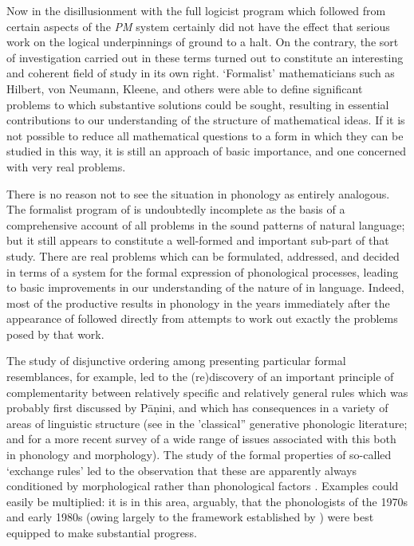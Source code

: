 Now in  the disillusionment with the full logicist program
which followed from certain aspects of the \textsl{PM} system
certainly did not have the effect that serious work on the logical
underpinnings of  ground to a halt. On the contrary, the
sort of investigation carried out in these terms turned out to
constitute an interesting and coherent field of study in its own
right. `Formalist' mathematicians such as Hilbert, 
von Neumann,
Kleene, and others were able to define significant problems to which
substantive solutions could be sought, resulting in essential
contributions to our understanding of the structure of mathematical
ideas. If it is not possible to reduce all mathematical questions to a
form in which they can be studied in this way, it is still an approach
of basic importance, and one concerned with very real problems.

There is no reason not to see the situation in phonology as entirely
analogous. The formalist program of \textsl{} is undoubtedly
incomplete as the basis of a comprehensive account of all problems in
the sound patterns of natural language; but it still appears to
constitute a well-formed and important sub-part of that study. There
are real problems which can be formulated, addressed, and decided in
terms of a system for the formal expression of phonological processes,
leading to basic improvements in our understanding of the nature of
 in language. Indeed, most of the productive results in
phonology in the years immediately after the appearance of
\textsl{} followed directly from attempts to work out exactly the
problems posed by that work.

The study of disjunctive ordering among  presenting
particular formal resemblances, for example, led to the (re)discovery
of an important principle of complementarity between relatively
specific and relatively general rules which was probably first
discussed by Pāṇini, and which has consequences in a variety of areas
of linguistic structure (see
\citealt{sra74:orgphon,kiparsky:elsewhere} in the 'classical''
generative phonologic literature; and \citealt{bakovic13:blocking} for
a more recent survey of a wide range of issues associated with
this both in phonology and morphology). The study of the formal
properties of so-called `exchange rules'  led to the observation
that these are apparently always conditioned by morphological rather
than phonological factors
\citep{sra.browne73:exchange,mccawley74:review.spe}. Examples could
easily be multiplied: it is in this area, arguably, that the
phonologists of the 1970s and early 1980s (owing largely to the
framework established by \textsl{}) were best equipped to make
substantial progress.

